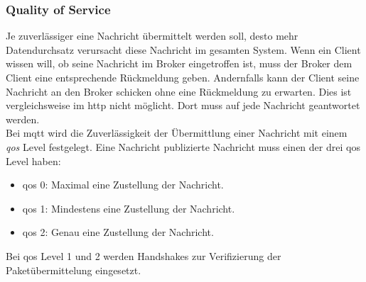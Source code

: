 \subsubsection{Quality of Service} \label{s:qos}
Je zuverlässiger eine Nachricht übermittelt werden soll, desto mehr Datendurchsatz verursacht diese Nachricht im gesamten System. Wenn ein Client wissen will, ob seine Nachricht im Broker eingetroffen ist, muss der Broker dem Client eine entsprechende Rückmeldung geben. Andernfalls kann der Client seine Nachricht an den Broker schicken ohne eine Rückmeldung zu erwarten. Dies ist vergleichsweise im \ac{http} nicht möglicht. Dort muss auf jede Nachricht geantwortet werden.\\
Bei \ac{mqtt} wird die Zuverlässigkeit der Übermittlung einer Nachricht mit einem \textit{\acf{qos}} Level festgelegt. Eine Nachricht publizierte Nachricht muss einen der drei \ac{qos} Level haben:
\begin{itemize}
    \item \ac{qos} 0: Maximal eine Zustellung der Nachricht.
    \item \ac{qos} 1: Mindestens eine Zustellung der Nachricht.
    \item \ac{qos} 2: Genau eine Zustellung der Nachricht.
\end{itemize}
Bei \ac{qos} Level 1 und 2 werden Handshakes zur Verifizierung der Paketübermittelung eingesetzt.\cite{mqtt5Specification}

